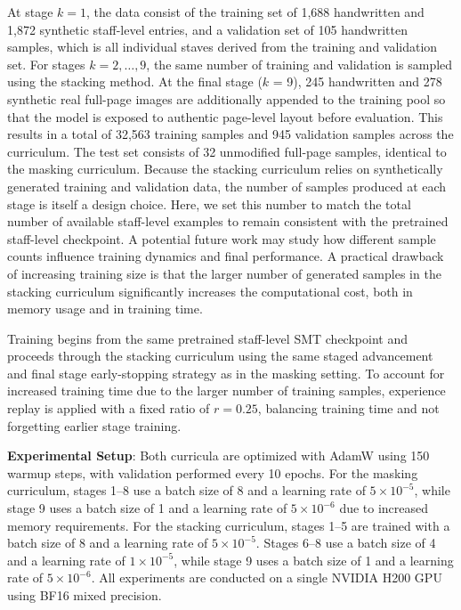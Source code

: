\documentclass{article}
\begin{document}
At stage $k = 1$, the data consist of the training set of 1,688 handwritten and 1,872 synthetic staff-level entries, and a validation set of 105 handwritten samples, which is all individual staves derived from the training and validation set. For stages $k = 2, \dots, 9$, the same number of training and validation is sampled using the stacking method. At the final stage ($k$ = 9), 245 handwritten and 278 synthetic real full-page images are additionally appended to the training pool so that the model is exposed to authentic page-level layout before evaluation. This results in a total of 32,563 training samples and 945 validation samples across the curriculum. The test set consists of 32 unmodified full-page samples, identical to the masking curriculum. Because the stacking curriculum relies on synthetically generated training and validation data, the number of samples produced at each stage is itself a design choice. Here, we set this number to match the total number of available staff-level examples to remain consistent with the pretrained staff-level checkpoint. A potential future work may study how different sample counts influence training dynamics and final performance. A practical drawback of increasing training size is that the larger number of generated samples in the stacking curriculum significantly increases the computational cost, both in memory usage and in training time.

Training begins from the same pretrained staff-level SMT checkpoint and proceeds through the stacking curriculum using the same staged advancement and final stage early-stopping strategy as in the masking setting. To account for increased training time due to the larger number of training samples, experience replay is applied with a fixed ratio of $r = 0.25$, balancing training time and not forgetting earlier stage training.


\textbf{Experimental Setup}:
Both curricula are optimized with AdamW using 150 warmup steps, with validation performed every 10 epochs. For the masking curriculum, stages 1--8 use a batch size of 8 and a learning rate of $5 \times 10^{-5}$, while stage 9 uses a batch size of 1 and a learning rate of $5 \times 10^{-6}$ due to increased memory requirements. For the stacking curriculum, stages 1--5 are trained with a batch size of 8 and a learning rate of $5 \times 10^{-5}$. Stages 6--8 use a batch size of 4 and a learning rate of $1 \times 10^{-5}$, while stage 9 uses a batch size of 1 and a learning rate of $5 \times 10^{-6}$. All experiments are conducted on a single NVIDIA H200 GPU using BF16 mixed precision.
\end{document}
